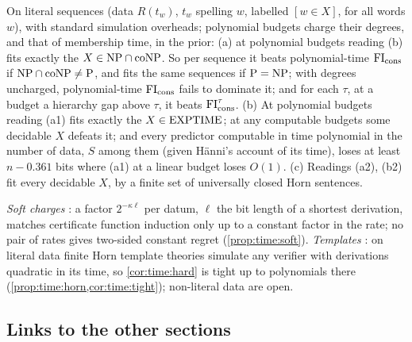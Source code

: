 \begin{corollary}\label{cor:time:separations}
On literal sequences (data $R(t_w)$, $t_w$ spelling $w$, labelled $[w\in X]$, for all words $w$), with standard simulation overheads; polynomial budgets charge their degrees, and that of membership time, in the prior:
(a)  at polynomial budgets reading (b) fits exactly the $X\in\mathrm{NP}\cap\mathrm{coNP}$. So per sequence it beats polynomial-time $\mathrm{FI}_{\mathrm{cons}}$ if $\mathrm{NP}\cap\mathrm{coNP}\ne\mathrm{P}$, and fits the same sequences if $\mathrm{P}=\mathrm{NP}$; with degrees uncharged, polynomial-time $\mathrm{FI}_{\mathrm{cons}}$ fails to dominate it; and for each $\tau$, at a budget a hierarchy gap above $\tau$, it beats $\mathrm{FI}_{\mathrm{cons}}^\tau$.
(b)  At polynomial budgets reading (a1) fits exactly the $X\in\mathrm{EXPTIME}$; at any computable budgets some decidable $X$ defeats it; and every predictor computable in time polynomial in the number of data, $S$ among them (given H\"anni's account of its time), loses at least $n-0.361$ bits where (a1) at a linear budget loses $O(1)$.
(c)  Readings (a2), (b2) fit every decidable $X$, by a finite set of universally closed Horn sentences.
\end{corollary}

\noindent\emph{Soft charges} : a factor $2^{-\kappa\ell}$ per datum, $\ell$ the bit length of a shortest derivation, matches certificate function induction only up to a constant factor in the rate; no pair of rates gives two-sided constant regret (\cref{prop:time:soft}). \emph{Templates} : on literal data finite Horn template theories simulate any verifier with derivations quadratic in its time, so \cref{cor:time:hard} is tight up to polynomials there (\cref{prop:time:horn,cor:time:tight}); non-literal data are open.

\subsection{Links to the other sections}\label{sec:time:summary}

